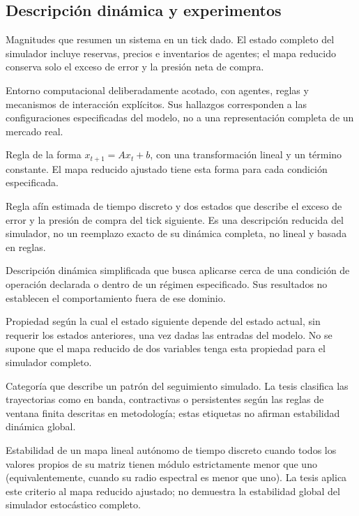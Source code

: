 \subsection*{Descripción dinámica y experimentos}
\begin{description}[style=unboxed,leftmargin=0pt,labelwidth=0pt,labelsep=0.5em,itemsep=0.1em]
  \item[Estado:] Magnitudes que resumen un sistema en un tick dado. El estado completo del simulador incluye reservas, precios e inventarios de agentes; el mapa reducido conserva solo el exceso de error y la presión neta de compra.
  \item[Micromundo:] Entorno computacional deliberadamente acotado, con agentes, reglas y mecanismos de interacción explícitos. Sus hallazgos corresponden a las configuraciones especificadas del modelo, no a una representación completa de un mercado real.
  \item[Mapa afín:] Regla de la forma $x_{t+1}=Ax_t+b$, con una transformación lineal y un término constante. El mapa reducido ajustado tiene esta forma para cada condición especificada.
  \item[Mapa reducido:] Regla afín estimada de tiempo discreto y dos estados que describe el exceso de error y la presión de compra del tick siguiente. Es una descripción reducida del simulador, no un reemplazo exacto de su dinámica completa, no lineal y basada en reglas.
  \item[Modelo local / linealización:] Descripción dinámica simplificada que busca aplicarse cerca de una condición de operación declarada o dentro de un régimen especificado. Sus resultados no establecen el comportamiento fuera de ese dominio.
  \item[Propiedad de Markov:] Propiedad según la cual el estado siguiente depende del estado actual, sin requerir los estados anteriores, una vez dadas las entradas del modelo. No se supone que el mapa reducido de dos variables tenga esta propiedad para el simulador completo.
  \item[Régimen:] Categoría que describe un patrón del seguimiento simulado. La tesis clasifica las trayectorias como en banda, contractivas o persistentes según las reglas de ventana finita descritas en metodología; estas etiquetas no afirman estabilidad dinámica global.
  \item[Estabilidad de Schur:] Estabilidad de un mapa lineal autónomo de tiempo discreto cuando todos los valores propios de su matriz tienen módulo estrictamente menor que uno (equivalentemente, cuando su radio espectral es menor que uno). La tesis aplica este criterio al mapa reducido ajustado; no demuestra la estabilidad global del simulador estocástico completo.

\end{description}
